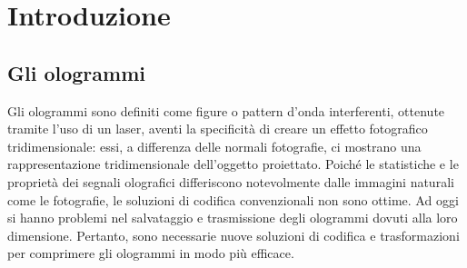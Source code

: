 \chapter{Introduzione}

\section{Gli ologrammi}
Gli ologrammi sono definiti come figure o pattern d’onda interferenti, ottenute tramite l’uso di un laser, aventi la specificità di creare un effetto fotografico tridimensionale: essi, a differenza delle normali fotografie, ci mostrano una rappresentazione tridimensionale dell'oggetto proiettato. Poiché le statistiche e le proprietà dei segnali olografici differiscono notevolmente dalle immagini naturali come le fotografie, le soluzioni di codifica convenzionali non sono ottime. Ad oggi si hanno problemi nel salvataggio e trasmissione degli ologrammi dovuti alla loro dimensione. Pertanto, sono necessarie nuove soluzioni di codifica e trasformazioni per comprimere gli ologrammi in modo più efficace.

